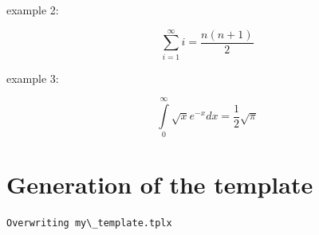 \documentclass[reprint, floatfix, groupaddress, prb]{article}
\begin{document}
    example 2:

\[\sum_{i=1}^{\infty} i = \frac{n(n+1)}{2}\]

    example 3:

\[ \int\limits_0^\infty {\sqrt{x} e^{ - x} dx} = \frac{1}{2}\sqrt{\pi}\]

    \hypertarget{generation-of-the-template}{%
\section{Generation of the template}\label{generation-of-the-template}}

    \begin{Verbatim}[commandchars=\\\{\}]
Overwriting my\_template.tplx
    \end{Verbatim}


    
    
    
\end{document}
